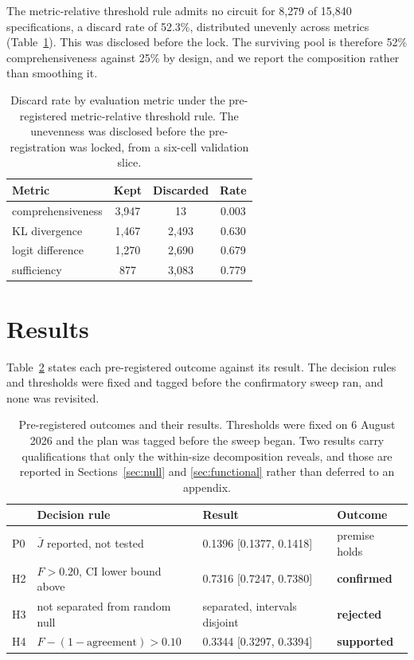 \documentclass[11pt]{article}
\begin{document}
The metric-relative threshold rule admits no circuit for 8{,}279 of 15{,}840
specifications, a discard rate of 52.3\%, distributed unevenly across metrics
(Table~\ref{tab:discard}). This was disclosed before the lock. The surviving pool
is therefore 52\% comprehensiveness against 25\% by design, and we report the
composition rather than smoothing it.

\begin{table}[htbp]
\centering
\caption{Discard rate by evaluation metric under the pre-registered
metric-relative threshold rule. The unevenness was disclosed before the
pre-registration was locked, from a six-cell validation slice.}
\label{tab:discard}
\begin{tabular}{lccc}
\toprule
Metric & Kept & Discarded & Rate \\
\midrule
comprehensiveness & 3,947 & 13 & 0.003 \\
KL divergence & 1,467 & 2,493 & 0.630 \\
logit difference & 1,270 & 2,690 & 0.679 \\
sufficiency & 877 & 3,083 & 0.779 \\
\bottomrule
\end{tabular}
\end{table}

\section{Results}

Table~\ref{tab:hyp} states each pre-registered outcome against its result. The
decision rules and thresholds were fixed and tagged before the confirmatory sweep
ran, and none was revisited.

\begin{table}[htbp]
\centering
\caption{Pre-registered outcomes and their results. Thresholds were fixed on
6 August 2026 and the plan was tagged before the sweep began. Two results carry
qualifications that only the within-size decomposition reveals, and those are
reported in Sections~\ref{sec:null} and \ref{sec:functional} rather than deferred
to an appendix.}
\label{tab:hyp}
\begin{tabular}{llll}
\toprule
& Decision rule & Result & Outcome \\
\midrule
P0 & $\bar{J}$ reported, not tested & 0.1396 [0.1377, 0.1418] & premise holds \\
H2 & $F > 0.20$, CI lower bound above & 0.7316 [0.7247, 0.7380] & \textbf{confirmed} \\
H3 & not separated from random null & separated, intervals disjoint & \textbf{rejected} \\
H4 & $F - (1 - \text{agreement}) > 0.10$ & 0.3344 [0.3297, 0.3394] & \textbf{supported} \\
\bottomrule
\end{tabular}
\end{table}
\end{document}
